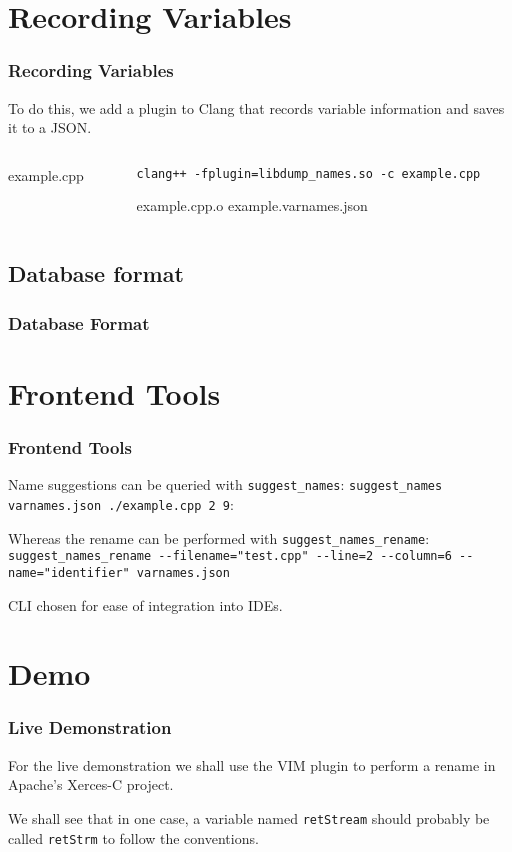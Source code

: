 \documentclass[12pt]{beamer}
\begin{document}
\section{Recording Variables}
\begin{frame}
	\frametitle{Recording Variables}
	To do this, we add a plugin to Clang that records variable information and
	saves it to a JSON.
	\begin{columns}
		\begin{column}{0.50\textwidth}
			
					{example.cpp}
		\end{column}
		\begin{column}{0.35\textwidth}
			\lstset{breaklines=true}
			\lstinline|clang++ -fplugin=libdump_names.so -c example.cpp|
			\lstset{breaklines=false}

			\textrightarrow example.cpp.o
			\textrightarrow example.varnames.json
		\end{column}
	\end{columns}
\end{frame}
\subsection{Database format}
\begin{frame}
	\frametitle{Database Format}
	
\end{frame}
\section{Frontend Tools}
\begin{frame}
	\frametitle{Frontend Tools}

	Name suggestions can be queried with \lstinline|suggest_names|:
	\lstinline|suggest_names varnames.json ./example.cpp 2 9|:
	

	Whereas the rename can be performed with \lstinline|suggest_names_rename|:
	\lstset{breaklines=true}
	\lstinline|suggest_names_rename --filename="test.cpp" --line=2 --column=6 --name="identifier" varnames.json|
	\lstset{breaklines=false}

	CLI chosen for ease of integration into IDEs.
\end{frame}
\section{Demo}
\begin{frame}
	\frametitle{Live Demonstration}

	For the live demonstration we shall use the VIM plugin to perform a rename
	in Apache's Xerces-C project.

	We shall see that in one case, a variable named \lstinline|retStream| should
	probably be called \lstinline|retStrm| to follow the conventions.

\end{frame}
\end{document}
